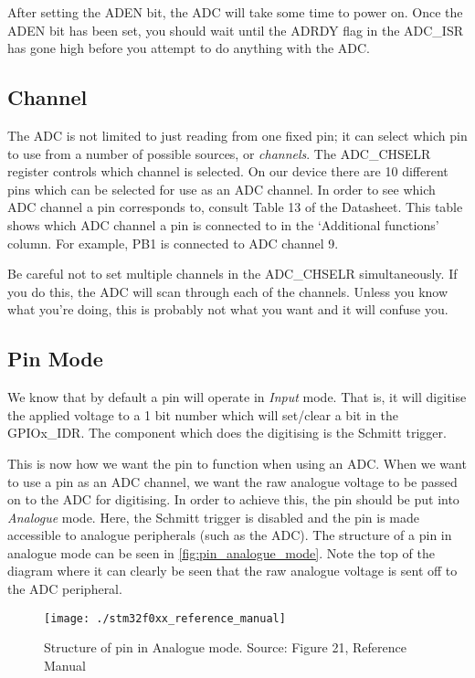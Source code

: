 After setting the ADEN bit, the ADC will take some time to power on. Once the ADEN bit has been set, you should wait until the ADRDY flag in the ADC\_ISR has gone high before you attempt to do anything with the ADC. 

\subsection{Channel}
The ADC is not limited to just reading from one fixed pin; it can select which pin to use from a number of possible sources, or \emph{channels}.
The ADC\_CHSELR register controls which channel is selected. On our device there are 10 different pins which can be selected for use as an ADC channel. In order to see which ADC channel a pin corresponds to, consult Table 13 of the Datasheet. This table shows which ADC channel a pin is connected to in the `Additional functions' column. For example, PB1 is connected to ADC channel 9.

Be careful not to set multiple channels in the ADC\_CHSELR simultaneously. If you do this, the ADC will scan through each of the channels. Unless you know what you're doing, this is probably not what you want and it will confuse you.

\subsection{Pin Mode}
We know that by default a pin will operate in \emph{Input} mode. That is, it will digitise the applied voltage to a 1 bit number which will set/clear a bit in the GPIOx\_IDR. The component which does the digitising is the Schmitt trigger. 

This is now how we want the pin to function when using an ADC. When we want to use a pin as an ADC channel, we want the raw analogue voltage to be passed on to the ADC for digitising. In order to achieve this, the pin should be put into \emph{Analogue} mode. Here, the Schmitt trigger is disabled and the pin is made accessible to analogue peripherals (such as the ADC). The structure of a pin in analogue mode can be seen in \autoref{fig:pin_analogue_mode}. Note the top of the diagram where it can clearly be seen that the raw analogue voltage is sent off to the ADC peripheral.

\begin{figure}
\centering
\texttt{[image: ./stm32f0xx\_reference\_manual]}
\caption{Structure of pin in Analogue mode. Source: Figure 21, Reference Manual}
\label{fig:pin_analogue_mode}
\end{figure}


